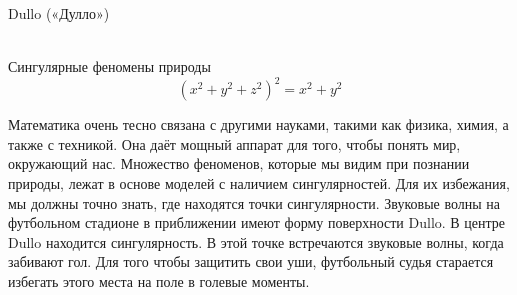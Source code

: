 \documentclass[ru]{./../../common/SurferDesc}%
\begin{document}
\footnotesize


\begin{surferPage}
  \begin{surferTitle}Dullo («Дулло»)\end{surferTitle}  
  \\
Сингулярные феномены природы\\
\smallskip
\[(x^2+ y^2+ z^2)^2	= x^2+ y^2\]

\singlespacing
Математика очень тесно связана с другими науками, такими как физика, химия, а также с техникой. Она даёт мощный аппарат для того, чтобы понять мир, окружающий нас.
\singlespacing
Множество феноменов, которые мы видим при познании природы, лежат в основе моделей с наличием сингулярностей. Для их избежания, мы должны точно знать, где находятся точки сингулярности. 
\singlespacing
Звуковые волны на футбольном стадионе в приближении имеют форму поверхности Dullo. В центре Dullo находится сингулярность. В этой точке встречаются звуковые волны, когда забивают гол. Для того чтобы защитить свои уши, футбольный судья старается избегать этого места на поле в голевые моменты.

  \begin{surferText}
     \end{surferText}
\end{surferPage}
\end{document}
